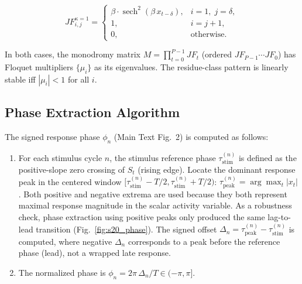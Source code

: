 \documentclass[12pt,a4paper]{article}
\begin{document}
\begin{equation}

JF^{\kappa=1}_{i,j} = 

\begin{cases}

\beta \cdot \operatorname{sech}^2(\beta \, x_{t-\delta}), & i=1,\; j=\delta,\\

1, & i = j+1,\\

0, & \text{otherwise}.

\end{cases}

\label{eq:jacobian_pure_delay}

\end{equation}



In both cases, the monodromy matrix $M = \prod_{t=0}^{P-1} JF_t$ (ordered $JF_{P-1} \cdots JF_0$) has Floquet multipliers $\{\mu_i\}$ as its eigenvalues. The residue-class pattern is linearly stable iff $|\mu_i| < 1$ for all $i$.



\subsection{Phase Extraction Algorithm}

\label{sec:phase_extraction}



The signed response phase $\phi_n$ (Main Text Fig.~2) is computed as follows:



\begin{enumerate}

  \item For each stimulus cycle $n$, the stimulus reference phase $\tau_{\mathrm{stim}}^{(n)}$ is defined as the positive-slope zero crossing of $S_t$ (rising edge). Locate the dominant response peak in the centered window $[\tau_{\mathrm{stim}}^{(n)}-T/2, \tau_{\mathrm{stim}}^{(n)}+T/2)$: $\tau_{\mathrm{peak}}^{(n)} = \arg\max_t |x_t|$. Both positive and negative extrema are used because they both represent maximal response magnitude in the scalar activity variable. As a robustness check, phase extraction using positive peaks only produced the same lag-to-lead transition (Fig.~\ref{fig:s20_phase}). The signed offset $\Delta_n = \tau_{\mathrm{peak}}^{(n)} - \tau_{\mathrm{stim}}^{(n)}$ is computed, where negative $\Delta_n$ corresponds to a peak before the reference phase (lead), not a wrapped late response.

  \item The normalized phase is $\phi_n = 2\pi\,\Delta_n/T \in (-\pi,\pi]$.

\end{enumerate}
\end{document}
